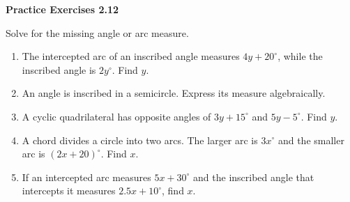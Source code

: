 \vspace{0.3ex}
\noindent\textbf{Practice Exercises 2.12}

\vspace{0.2ex}

Solve for the missing angle or arc measure.

\begin{enumerate}
    \item The intercepted arc of an inscribed angle measures $4y + 20^\circ$, while the inscribed angle is $2y^\circ$. Find $y$.
    \item An angle is inscribed in a semicircle. Express its measure algebraically.
    \item A cyclic quadrilateral has opposite angles of $3y + 15^\circ$ and $5y - 5^\circ$. Find $y$.
    \item A chord divides a circle into two arcs. The larger arc is $3x^\circ$ and the smaller arc is $(2x + 20)^\circ$. Find $x$.
    \item If an intercepted arc measures $5x + 30^\circ$ and the inscribed angle that intercepts it measures $2.5x + 10^\circ$, find $x$.
\end{enumerate}
